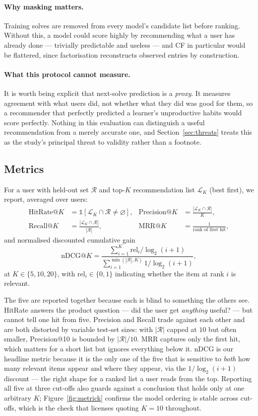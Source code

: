 \documentclass[12pt,a4paper]{article}
\newcommand{\ndcg}{nDCG}
\begin{document}
\paragraph{Why masking matters.} Training solves are removed from every model's candidate
list before ranking. Without this, a model could score highly by recommending what a user
has already done --- trivially predictable and useless --- and CF in particular would be
flattered, since factorisation reconstructs observed entries by construction.

\paragraph{What this protocol cannot measure.} It is worth being explicit that next-solve
prediction is a \emph{proxy}. It measures agreement with what users did, not whether what
they did was good for them, so a recommender that perfectly predicted a learner's
unproductive habits would score perfectly. Nothing in this evaluation can distinguish a
useful recommendation from a merely accurate one, and Section~\ref{sec:threats} treats
this as the study's principal threat to validity rather than a footnote.

\subsection{Metrics}
For a user with held-out set $\mathcal{R}$ and top-$K$ recommendation list $\mathcal{L}_K$
(best first), we report, averaged over users:
\begin{align*}
\text{HitRate@}K &= \mathbb{1}[\mathcal{L}_K \cap \mathcal{R} \neq \varnothing], &
\text{Precision@}K &= \frac{|\mathcal{L}_K \cap \mathcal{R}|}{K}, \\
\text{Recall@}K &= \frac{|\mathcal{L}_K \cap \mathcal{R}|}{|\mathcal{R}|}, &
\text{MRR@}K &= \frac{1}{\text{rank of first hit}},
\end{align*}
and normalised discounted cumulative gain
\[
\text{\ndcg{}@}K = \frac{\sum_{i=1}^{K} \mathrm{rel}_i/\log_2(i+1)}
{\sum_{i=1}^{\min(|\mathcal{R}|,K)} 1/\log_2(i+1)},
\]
at $K\in\{5,10,20\}$, with $\mathrm{rel}_i\in\{0,1\}$ indicating whether the item at
rank $i$ is relevant.

The five are reported together because each is blind to something the others see.
HitRate answers the product question --- did the user get \emph{anything} useful? --- but
cannot tell one hit from five. Precision and Recall trade against each other and are both
distorted by variable test-set sizes: with $|\mathcal{R}|$ capped at $10$ but often
smaller, Precision@10 is bounded by $|\mathcal{R}|/10$. MRR captures only the first hit,
which matters for a short list but ignores everything below it. \ndcg{} is our headline metric because it is the only one of the five that is
sensitive to \emph{both} how many relevant items appear and where they appear, via the
$1/\log_2(i+1)$ discount --- the right shape for a ranked list a user reads from the top.
Reporting all five at three cut-offs also guards against a conclusion that holds only at
one arbitrary $K$; Figure~\ref{fig:metrick} confirms the model ordering is stable across
cut-offs, which is the check that licenses quoting $K=10$ throughout.
\end{document}
